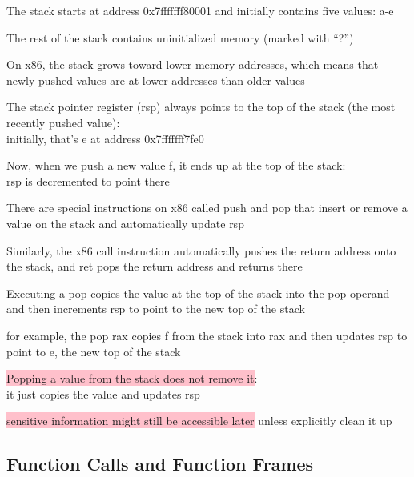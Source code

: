 \documentclass[]{project_plan}
\begin{document}
The stack starts at address 0x7fffffff80001 and initially contains five values: a-e

The rest of the stack contains uninitialized memory (marked with “?”)

On x86, the stack grows toward lower memory addresses, which means that newly pushed values are at lower
addresses than older values

The stack pointer register (rsp) always points to the top of the stack (the most recently pushed value):\\
initially, that’s e at address 0x7fffffff7fe0

Now, when we push a new value f, it ends up at the top of the stack:\\
rsp is decremented to point there

There are special instructions on x86 called push and pop that insert or
remove a value on the stack and automatically update rsp

Similarly, the x86 call instruction automatically pushes the return address
onto the stack, and ret pops the return address and returns there

Executing a pop copies the value at the top of the stack into the pop
operand and then increments rsp to point to the new top of the stack

for example, the pop rax copies f from the stack into rax and then updates
rsp to point to e, the new top of the stack

\colorbox{pink}{Popping a value from the stack does not remove it}:\\
it just copies the value and updates rsp

\colorbox{pink}{sensitive information might still be accessible later} unless explicitly clean it up

\subsection{Function Calls and Function Frames}
\end{document}
